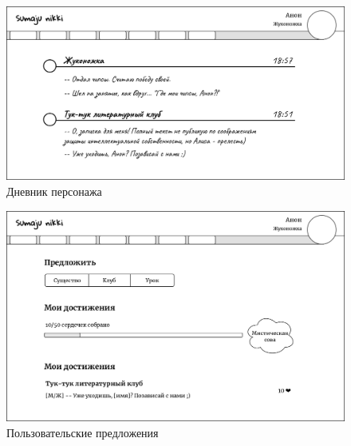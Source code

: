 \documentclass[12pt, a4paper]{article}
\begin{document}
\begin{figure}[H]
  \centering
  \includegraphics[width=15.6cm]{ui-mockup-diary.png}
  \caption{Дневник персонажа}
\end{figure}

\begin{figure}[H]
  \centering
  \includegraphics[width=15.6cm]{ui-mockup-suggestions.png}
  \caption{Пользовательские предложения}
\end{figure}
\end{document}
